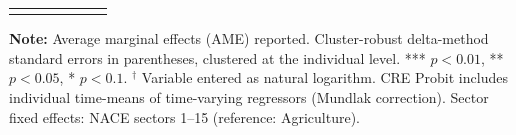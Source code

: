 \begin{landscape}
\begin{table}[htbp]
\begin{tabular*}{\linewidth}{ @{\extracolsep{\fill}} @{}lcccccc@{} @{} }
  \bottomrule
  \vspace{1.5pt}
\end{tabular*}
\smallskip
\begin{minipage}{\linewidth}
\footnotesize
\textbf{Note:} Average marginal effects (AME) reported. Cluster-robust delta-method standard errors in parentheses, clustered at the individual level. *** $p<0.01$, ** $p<0.05$, * $p<0.1$. $^\dagger$ Variable entered as natural logarithm. CRE Probit includes individual time-means of time-varying regressors (Mundlak correction). Sector fixed effects: NACE sectors 1--15 (reference: Agriculture).
\end{minipage}
\end{table}
\end{landscape}
